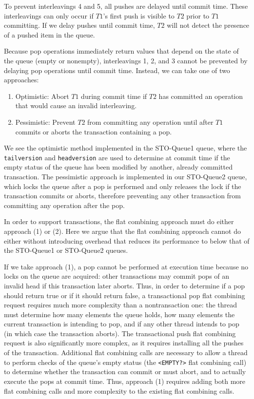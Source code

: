 To prevent interleavings 4 and 5, all pushes are delayed until commit time. These interleavings can only occur if $T1$'s first push is visible to $T2$ prior to $T1$ committing. If we delay pushes until commit time, $T2$ will not detect the presence of a pushed item in the queue.

Because pop operations immediately return values that depend on the state of the queue (empty or nonempty), interleavings 1, 2, and 3 cannot be prevented by delaying pop operations until commit time. Instead, we can take one of two approaches:
\begin{enumerate}
    \item Optimistic: Abort $T1$ during commit time if $T2$ has committed an operation that would cause an invalid interleaving.
    \item Pessimistic: Prevent $T2$ from committing any operation until after $T1$ commits or aborts the transaction containing a pop.
\end{enumerate}

We see the optimistic method implemented in the STO-Queue1 queue, where the \texttt{tailversion} and \texttt{headversion} are used to determine at commit time if the empty status of the queue has been modified by another, already committed transaction. The pessimistic approach is implemented in our STO-Queue2 queue, which locks the queue after a pop is performed and only releases the lock if the transaction commits or aborts, therefore preventing any other transaction from committing any operation after the pop.

In order to support transactions, the flat combining approach must do either approach (1) or (2). Here we argue that the flat combining approach cannot do either without introducing overhead that reduces its performance to below that of the STO-Queue1 or STO-Queue2 queues.

If we take approach (1), a pop cannot be performed at execution time because no locks on the queue are acquired: other transactions may commit pops of an invalid head if this transaction later aborts. Thus, in order to determine if a pop should return true or if it should return false, a transactional pop flat combining request requires much more complexity than a nontransaction one: the thread must determine how many elements the queue holds, how many elements the current transaction is intending to pop, and if any other thread intends to pop (in which case the transaction aborts). The transactional push flat combining request is also significantly more complex, as it requires installing all the pushes of the transaction. Additional flat combining calls are necessary to allow a thread to perform checks of the queue's empty status (the \texttt{<EMPTY?>} flat combining call) to determine whether the transaction can commit or must abort, and to actually execute the pops at commit time. Thus, approach (1) requires adding both more flat combining calls and more complexity to the existing flat combining calls.

